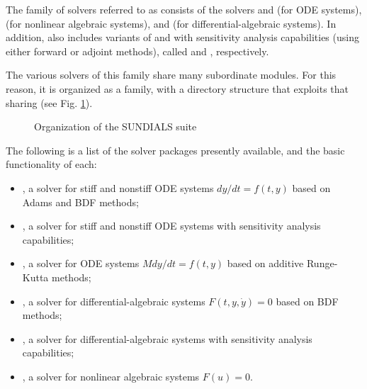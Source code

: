 %
The family of solvers referred to as {\sundials} consists of the solvers
{\cvode} and {\arkode} (for ODE systems), {\kinsol} (for nonlinear algebraic
systems), and {\ida} (for differential-algebraic systems).  In addition,
{\sundials} also includes variants of {\cvode} and {\ida} with sensitivity analysis 
capabilities (using either forward or adjoint methods), called {\cvodes} and
{\idas}, respectively.

The various solvers of this family share many subordinate modules.
For this reason, it is organized as a family, with a directory
structure that exploits that sharing (see Fig. \ref{f:sunorg}).
\begin{figure}
\caption {Organization of the SUNDIALS suite}\label{f:sunorg}
\end{figure}
The following is a list of the solver packages presently available, and
the basic functionality of each:
\begin{itemize}

\item {\cvode},  
  a solver for stiff and nonstiff ODE systems $dy/dt = f(t,y)$ based
  on Adams and BDF methods;

\item {\cvodes},
  a solver for stiff and nonstiff ODE systems with sensitivity analysis capabilities;

\item {\arkode},
  a solver for ODE systems $M dy/dt = f(t,y)$ based on additive Runge-Kutta methods;

\item {\ida},
  a solver for differential-algebraic systems $F(t,y,\dot{y}) = 0$ based on BDF methods;

\item {\idas},
  a solver for differential-algebraic systems
  with sensitivity analysis capabilities;

\item {\kinsol}, 
  a solver for nonlinear algebraic systems $F(u) = 0$.

\end{itemize}
